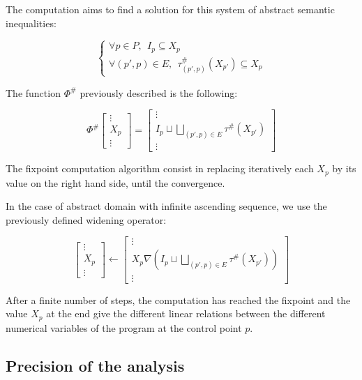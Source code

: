 \documentclass[a4paper,english,titlepage,11pt]{article}
\begin{document}
The computation aims to find a solution for this system of abstract semantic
inequalities:

$$\left\{ \begin{array}{l}
\forall p \in P, \ \ I_p \subseteq X_p \\
\forall (p',p) \in E,\ \  \tau^\#_{(p',p)}(X_{p'}) \subseteq X_p
\end{array} \right.$$


The function $\Phi^\#$ previously described is the following:

$$\Phi^\#\left[ \begin{array}{c}
\vdots \\
X_p \\
\vdots
\end{array} \right] = \left[ \begin{array}{c} 
\vdots \\
I_p \sqcup \displaystyle \bigsqcup_{(p',p) \in E} \tau^\# (X_{p'}) \\
\vdots
\end{array} \right]$$

The fixpoint computation algorithm consist in replacing iteratively each $X_p$ by its value
on the right hand side, until the convergence.

In the case of abstract domain with infinite ascending sequence, we use the
previously defined widening operator:

$$\left[ \begin{array}{c}
\vdots \\
X_p \\
\vdots
\end{array} \right] \longleftarrow \left[ \begin{array}{c} 
\vdots \\
X_p \nabla \left( I_p \sqcup \displaystyle \bigsqcup_{(p',p) \in E} \tau^\#
(X_{p'}) \right) \\
\vdots
\end{array} \right]$$



After a finite number of steps, the computation has reached the fixpoint and the
value $X_p$ at the end give the different linear relations between the
different numerical variables of the program at the control point $p$.

\subsection{Precision of the analysis}
\end{document}
